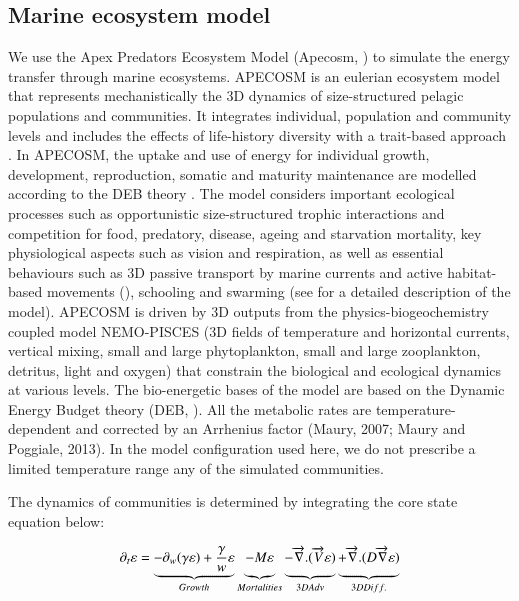 \subsection{Marine ecosystem model}
\label{sec:apecosm}

We use the Apex Predators Ecosystem Model (Apecosm, \citealp{mauryModelingEnvironmentalEffects2007, mauryOverviewAPECOSMSpatialized2010}) to simulate the energy transfer through marine ecosystems. 
APECOSM is an eulerian ecosystem model that represents mechanistically the 3D dynamics of size-structured pelagic populations and communities. It integrates individual, population and community levels and includes the effects of life-history diversity with a trait-based approach \citep{mauryIndividualsPopulationsCommunities2013}. In APECOSM, the uptake and use of energy for individual growth, development, reproduction, somatic and maturity maintenance are modelled according to the DEB theory \citep{koojmanDynamicEnergyBudget2010}. The model considers important ecological processes such as opportunistic size-structured trophic interactions and competition for food, predatory, disease, ageing and starvation mortality, key physiological aspects such as vision and respiration, as well as essential behaviours such as 3D passive transport by marine currents and active habitat-based movements (\cite{faugerasAdvectiondiffusionreactionSizestructuredFish2005}), schooling and swarming (see \citealp{mauryModelingEnvironmentalEffects2007, mauryIndividualsPopulationsCommunities2013, mauryCanSchoolingRegulate2017} for a detailed description of the model). APECOSM is driven by 3D outputs from the physics-biogeochemistry coupled model NEMO-PISCES (3D fields of temperature and horizontal currents, vertical mixing, small and large phytoplankton, small and large zooplankton, detritus, light and oxygen) that constrain the biological and ecological dynamics at various levels.
The bio-energetic bases of the model are based on the Dynamic Energy Budget theory (DEB, \citealp{koojmanDynamicEnergyBudget2010}). All the metabolic rates are temperature-dependent and corrected by an Arrhenius factor (Maury, 2007; Maury and Poggiale, 2013). In the model configuration used here, we do not prescribe a limited temperature range any of the simulated communities.

The dynamics of communities is determined by integrating the core state equation below:

\begin{equation}
\partial_t \varepsilon = \underbrace{- \partial_w(\gamma \varepsilon) + \frac{\gamma}{w}\varepsilon}_{Growth} 
\underbrace{- M \varepsilon \vphantom{\frac{\gamma}{w}\varepsilon}}_{Mortalities}
\underbrace{-\overrightarrow{\nabla}.(\overrightarrow{V} \varepsilon) \vphantom{\frac{\gamma}{w}\varepsilon}}_{3D Adv} 
\underbrace{+ \overrightarrow{\nabla} . (D \overrightarrow{\nabla} \varepsilon) \vphantom{\frac{\gamma}{w}\varepsilon}}_{3D Diff.}
\label{eq:apecosm_trend}
\end{equation}

